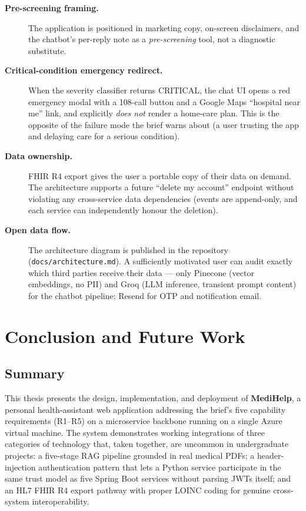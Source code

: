 \documentclass[12pt]{caltech_thesis}
\begin{document}
\begin{description}
    \item[\textbf{Pre-screening framing.}] The application is positioned
    in marketing copy, on-screen disclaimers, and the chatbot's per-reply
    note as a \textit{pre-screening} tool, not a diagnostic substitute.
    \item[\textbf{Critical-condition emergency redirect.}] When the
    severity classifier returns CRITICAL, the chat UI opens a red
    emergency modal with a 108-call button and a Google Maps
    ``hospital near me'' link, and explicitly \textit{does not} render
    a home-care plan. This is the opposite of the failure mode the
    brief warns about (a user trusting the app and delaying care for
    a serious condition).
    \item[\textbf{Data ownership.}] FHIR R4 export gives the user a
    portable copy of their data on demand. The architecture supports
    a future ``delete my account'' endpoint without violating any
    cross-service data dependencies (events are append-only, and each
    service can independently honour the deletion).
    \item[\textbf{Open data flow.}] The architecture diagram is
    published in the repository (\texttt{docs/architecture.md}). A
    sufficiently motivated user can audit exactly which third parties
    receive their data --- only Pinecone (vector embeddings, no PII)
    and Groq (LLM inference, transient prompt content) for the chatbot
    pipeline; Resend for OTP and notification email.
\end{description}


\chapter{Conclusion and Future Work}
\label{ch:concl}

\section{Summary}

This thesis presents the design, implementation, and deployment of
\textbf{MediHelp}, a personal health-assistant web application addressing
the brief's five capability requirements (R1--R5) on a microservice
backbone running on a single Azure virtual machine. The system
demonstrates working integrations of three categories of technology
that, taken together, are uncommon in undergraduate projects: a
five-stage RAG pipeline grounded in real medical PDFs; a
header-injection authentication pattern that lets a Python service
participate in the same trust model as five Spring Boot services
without parsing JWTs itself; and an HL7 FHIR R4 export pathway with
proper LOINC coding for genuine cross-system interoperability.
\end{document}
